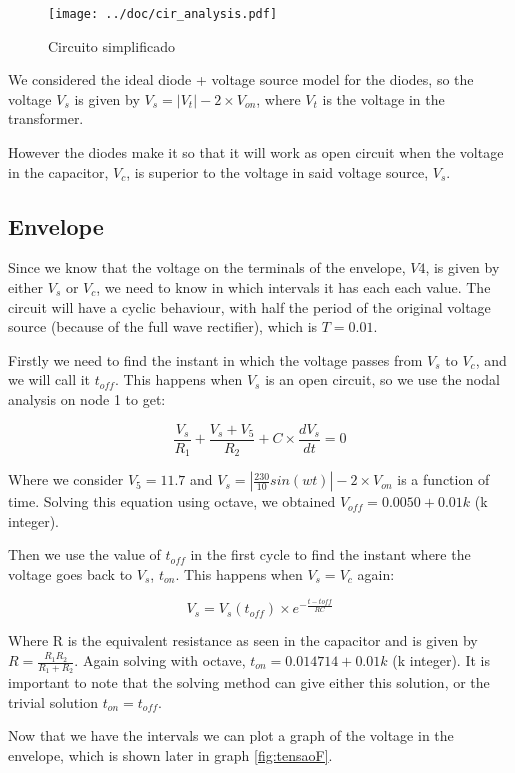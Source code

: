 \begin{figure}[H] \centering
\texttt{[image: ../doc/cir\_analysis.pdf]}
\caption{Circuito simplificado}
\label{fig:cir_simples}
\end{figure}

We considered the ideal diode + voltage source model for the diodes, so the voltage $V_s$ is given by $V_s= |V_t|-2\times V_{on}$, where $V_t$ is the voltage in the transformer.
\par
However the diodes make it so that it will work as open circuit when the voltage in the capacitor, $V_c$, is superior to the voltage in said voltage source, $V_s$.

\subsection{Envelope}
Since we know that the voltage on the terminals of the envelope, $V4$, is given by either $V_s$ or $V_c$, we need to know in which intervals it has each each value. The circuit will have a cyclic behaviour, with half the period of the original voltage source (because of the full wave rectifier), which is $T=0.01$.
\par
Firstly we need to find the instant in which the voltage passes from $V_s$ to $V_c$, and we will call it $t_{off}$. This happens when $V_s$ is an open circuit, so we use the nodal analysis on node 1 to get:

\begin{equation}\label{eq:t_off}
\frac{V_s}{R_1}+\frac{V_s+V_5}{R_2}+C\times\frac{dV_s}{dt}=0
\end{equation}

Where we consider $V_5=11.7$ and $V_s=|\frac{230}{10} sin(wt)|-2\times V_{on}$ is a function of time. Solving this equation using octave, we obtained $V_{off}=0.0050 + 0.01k$ (k integer).
\par
Then we use the value of $t_{off}$ in the first cycle to find the instant where the voltage goes back to $V_s$, $t_{on}$. This happens when $V_s=V_c$ again:

\begin{equation}\label{eq:t_on}
V_s=V_s(t_{off})\times e^{-\frac{t-t{off}}{RC}}
\end{equation}

Where R is the equivalent resistance as seen in the capacitor and is given by $R=\frac{R_1 R_2}{R_1 + R_2}$. Again solving with octave, $t_{on}=0.014714 + 0.01k$ (k integer). It is important to note that the solving method can give either this solution, or the trivial solution $t_{on}=t_{off}$.
\par
Now that we have the intervals we can plot a graph of the voltage in the envelope, which is shown later in graph \ref{fig:tensaoF}.


